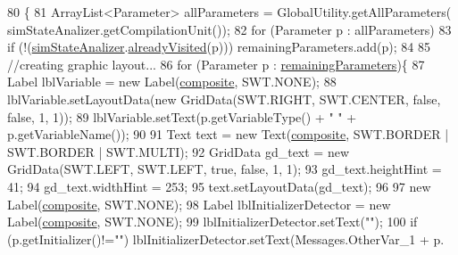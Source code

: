 \begin{DoxyCode}
80                                  \{
81         ArrayList<Parameter> allParameters = GlobalUtility.getAllParameters(
      simStateAnalizer.getCompilationUnit());
82         \textcolor{keywordflow}{for} (Parameter p : allParameters)
83             \textcolor{keywordflow}{if} (!(\hyperlink{classit_1_1isislab_1_1masonhelperdocumentation_1_1mason_1_1wizards_1_1_h___environment_page_a7c2fe727aad8e12d87fd87203f4f8ec9}{simStateAnalizer}.\hyperlink{classit_1_1isislab_1_1masonhelperdocumentation_1_1analizer_1_1_sim_state_analizer_a384f244c6d532ff8120eb40868a97989}{alreadyVisited}(p)))    
      remainingParameters.add(p); 
84         
85         \textcolor{comment}{//creating graphic layout...}
86         \textcolor{keywordflow}{for} (Parameter p : \hyperlink{classit_1_1isislab_1_1masonhelperdocumentation_1_1mason_1_1wizards_1_1_h___environment_page_a3bfb6dff5b562361a410cd31ff8815ba}{remainingParameters})\{
87             Label lblVariable = \textcolor{keyword}{new} Label(\hyperlink{classit_1_1isislab_1_1masonhelperdocumentation_1_1mason_1_1wizards_1_1_h___environment_page_acd16b35445be03e0527a45d03cf61573}{composite}, SWT.NONE);
88             lblVariable.setLayoutData(\textcolor{keyword}{new} GridData(SWT.RIGHT, SWT.CENTER, \textcolor{keyword}{false}, \textcolor{keyword}{false}, 1, 1));
89             lblVariable.setText(p.getVariableType() + \textcolor{stringliteral}{" "} + p.getVariableName());
90             
91             Text text = \textcolor{keyword}{new} Text(\hyperlink{classit_1_1isislab_1_1masonhelperdocumentation_1_1mason_1_1wizards_1_1_h___environment_page_acd16b35445be03e0527a45d03cf61573}{composite}, SWT.BORDER | SWT.BORDER | SWT.MULTI);
92             GridData gd\_text = \textcolor{keyword}{new} GridData(SWT.LEFT, SWT.LEFT, \textcolor{keyword}{true}, \textcolor{keyword}{false}, 1, 1);
93             gd\_text.heightHint = 41;
94             gd\_text.widthHint = 253;
95             text.setLayoutData(gd\_text);
96 
97             \textcolor{keyword}{new} Label(\hyperlink{classit_1_1isislab_1_1masonhelperdocumentation_1_1mason_1_1wizards_1_1_h___environment_page_acd16b35445be03e0527a45d03cf61573}{composite}, SWT.NONE);        
98             Label lblInitializerDetector = \textcolor{keyword}{new} Label(\hyperlink{classit_1_1isislab_1_1masonhelperdocumentation_1_1mason_1_1wizards_1_1_h___environment_page_acd16b35445be03e0527a45d03cf61573}{composite}, SWT.NONE);
99             lblInitializerDetector.setText(\textcolor{stringliteral}{""});
100             \textcolor{keywordflow}{if} (p.getInitializer()!=\textcolor{stringliteral}{""}) lblInitializerDetector.setText(Messages.OtherVar\_1 + p.

\end{DoxyCode}
